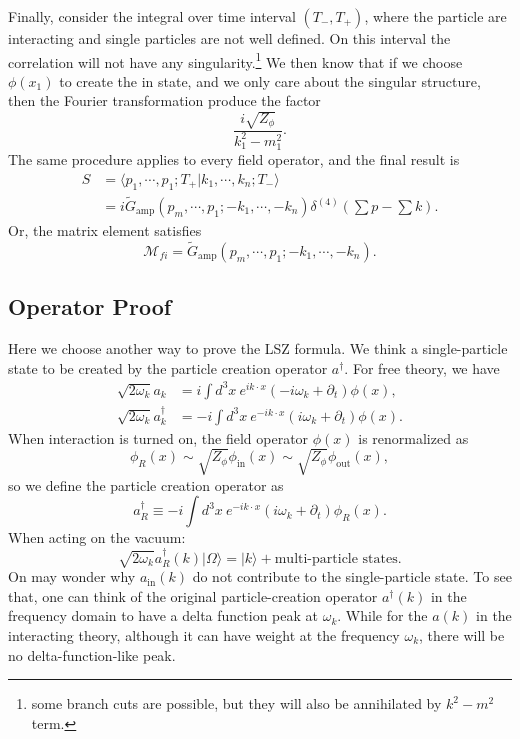 \documentclass[aps,prb,superscriptaddress,nofootinbib]{revtex4}
\begin{document}
Finally, consider the integral over time interval $(T_-,T_+)$, where the particle are interacting and single particles are not well defined.
On this interval the correlation will not have any singularity.\footnote{some branch cuts are possible, but they will also be annihilated by $k^2-m^2$ term.}
We then know that if we choose $\phi(x_1)$ to create the in state, and we only care about the singular structure, then the Fourier transformation produce the factor
\begin{equation}
	\frac{i\sqrt{Z_\phi}}{k_1^2-m_1^2}.
\end{equation}
The same procedure applies to every field operator, and the final result is
\begin{equation}
\begin{aligned}
	S &= \langle p_1,\cdots,p_1;T_+|k_1,\cdots,k_n;T_-\rangle \\
	&= i\tilde{G}_{\mathrm{amp}}(p_m,\cdots,p_1;-k_1,\cdots,-k_n) \delta^{(4)}\left(\sum p-\sum k \right).
\end{aligned}
\end{equation}
Or, the matrix element satisfies
\begin{equation}
	\mathcal M_{fi} = \tilde{G}_{\mathrm{amp}}(p_m,\cdots,p_1;-k_1,\cdots,-k_n).
\end{equation}


\subsection{Operator Proof}
Here we choose another way to prove the LSZ formula.
We think a single-particle state to be created by the particle creation operator $a^\dagger$.
For free theory, we have
\begin{equation}
\begin{aligned}
	\sqrt{2\omega_k} a_k &= i \int d^3 x\ e^{ik\cdot x}(-i\omega_k+\partial_t)\phi(x), \\
	\sqrt{2\omega_k} a^\dagger_k &= -i \int d^3 x\ e^{-ik\cdot x}(i\omega_k+\partial_t)\phi(x).
\end{aligned}
\end{equation}
When interaction is turned on, the field operator $\phi(x)$ is renormalized as
\begin{equation*}
	\phi_R(x) \sim \sqrt{Z_{\phi}} \phi_{\mathrm{in}}(x) \sim \sqrt{Z_{\phi}} \phi_{\mathrm{out}}(x),
\end{equation*}
so we define the particle creation operator as
\begin{equation}
	a_R^\dagger \equiv -i \int d^3 x\ e^{-ik\cdot x}(i\omega_k+\partial_t)\phi_R(x).
\end{equation}
When acting on the vacuum:
\begin{equation}
	\sqrt{2\omega_k} a_R^\dagger(k) |\Omega\rangle = |k\rangle + \text{multi-particle states}.
\end{equation}
On may wonder why $a_{\mathrm{in}}(k)$ do not contribute to the single-particle state. 
To see that, one can think of the original particle-creation operator $a^\dagger(k)$ in the frequency domain to have a delta function peak at $\omega_k$.
While for the $a(k)$ in the interacting theory, although it can have weight at the frequency $\omega_k$, there will be no delta-function-like peak.
\end{document}
